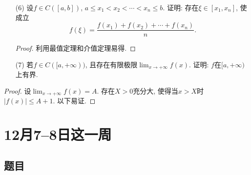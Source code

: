 \documentclass[UTF8,11pt, a4paper, oneside, fontset=none]{ctexbook}
\begin{document}
\begin{itemize}
\begin{proof}
(1) 注意最值一定是极值, 因此函数$f$在端点$a, b$处取到最值. 不妨设$f(a)$为最小值, $f(b)$为最大值. 反证, 设存在$x_1 < x_2$使得$f(x_1) > f(x_2)$. 那么在区间$[a, x_2]$上函数取到最大值, 且最大值非$f(x_2)$, 矛盾.

(2) 类似可证. 


\end{proof}


\item[(6)] 设$f \in C([a, b])$, $a \leq x_1 < x_2 < \cdots <x_n \leq b$. 证明: 存在$\xi \in [x_1, x_n]$, 使成立
\[
f(\xi) = \frac{f(x_1) + f(x_2) + \cdots + f(x_n)}{n}.
\]


\begin{proof}
利用最值定理和介值定理易得.

\end{proof}



\item[(7)] 若$f \in C([a, +\infty))$, 且存在有限极限$\lim_{x \to +\infty}f(x)$. 证明: $f$在$[a, +\infty)$上有界.
\end{itemize}


\begin{proof}

设$\lim_{x \to +\infty} f(x) = A$. 存在$X>0$充分大, 使得当$x > X$时$|f(x) | \leq A+1$. 以下易证.

\end{proof}

\clearpage

\section{12月7--8日这一周}

\subsection*{题目}
\end{document}
